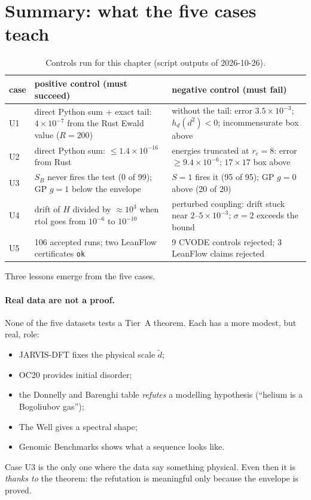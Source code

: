 \section{Summary: what the five cases teach}\label{ch5:bilan}

\begin{table}[ht]\centering\small
\caption{Controls run for this chapter (script outputs of 2026-10-26).}\label{ch5:tab:temoins}
\begin{tabular}{p{1.4cm}p{6.2cm}p{6.2cm}}\toprule
case & positive control (must succeed) & negative control (must fail)\\\midrule
U1 & direct Python sum $+$ exact tail: $4\times10^{-7}$ from the Rust Ewald value ($R=200$) &
without the tail: error $3.5\times10^{-3}$; $h_d(d^2)<0$; incommensurate box above\\
U2 & direct Python sum: $\le1.4\times10^{-16}$ from Rust &
energies truncated at $r_c=8$: error $\ge9.4\times10^{-6}$; $17\times17$ box above\\
U3 & $S_B$ never fires the test (0 of 99); GP $g=1$ below the envelope &
$S=1$ fires it (95 of 95); GP $g=0$ above (20 of 20)\\
U4 & drift of $H$ divided by $\approx10^3$ when rtol goes from $10^{-6}$ to $10^{-10}$ &
perturbed coupling: drift stuck near $2$--$5\times10^{-3}$; $\sigma=2$ exceeds the bound\\
U5 & 106 accepted runs; two LeanFlow certificates \texttt{ok} &
9 CVODE controls rejected; 3 LeanFlow claims rejected\\
\bottomrule\end{tabular}
\end{table}

Three lessons emerge from the five cases.

\paragraph{Real data are not a proof.} None of the five datasets tests a Tier~A theorem.
Each has a more modest, but real, role:
\begin{itemize}
\item JARVIS-DFT fixes the physical scale $\tilde d$;
\item OC20 provides initial disorder;
\item the Donnelly and Barenghi table \emph{refutes} a modelling hypothesis (``helium is a
Bogoliubov gas'');
\item The Well gives a spectral shape;
\item Genomic Benchmarks shows what a sequence looks like.
\end{itemize}
Case U3 is the only one where the data say something physical. Even then it is \emph{thanks to} the theorem: the
refutation is meaningful only because the envelope is proved.


